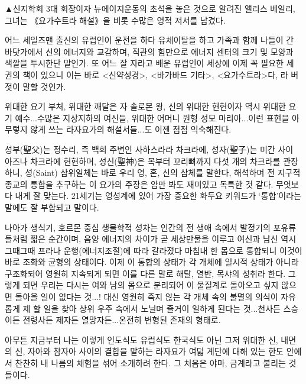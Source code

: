 \documentclass[12pt, a4paper, oneside]{book}
\begin{document}
▲신지학회 3대 회장이자 뉴에이지운동의 초석을 놓은 것으로 알려진 앨리스 베일리, 그녀는 《요가수트라 해설》을 비롯 수많은 영적 저서를 남겼다.






어느 세일즈맨 출신의 유럽인이 운전을 하다 유체이탈을 하고 가족과 함께 나들이 간 바닷가에서 신의 에너지와 교감하며, 직관의 힘만으로 에너지 센터의 크기 및 모양과 색깔을 투시한단 말인가. 또 어느 잘 자라고 배운 유럽인이 세상에 이제 꼭 필요한 세 권의 책이 있으니 이는 바로 <신약성경>, <바가바드 기타>, <요가수트라>다, 라 버젓이 말할 것인가.

위대한 요기 부처, 위대한 깨달은 자 솔로몬 왕, 신의 위대한 현현이자 역시 위대한 요기 예수...수많은 지상지하의 여신들, 위대한 어머니 원형 성모 마리아...이런 표현을 아무렇지 않게 쓰는 라자요가의 해설서들...도 이젠 점점 익숙해진다.




성부(聖父)는 정수리, 즉 백회 주변인 사하스라라 차크라에, 성자(聖子)는 미간 사이 아즈나 차크라에 현현하며, 성신(聖神)은 목부터 꼬리뼈까지 다섯 개의 차크라를 관장하니, 성(Saint) 삼위일체는 바로 우리 영, 혼, 신의 삼체를 말한다, 해석하며 전 지구적 종교의 통합을 추구하는 이 요가의 주장은 암만 봐도 재미있고 독특한 것 같다. 무엇보다 내게 잘 맞는다. 21세기는 영성계에 있어 가장 중요한 화두요 키워드가 ‘통합’이라는 말에도 잘 부합되고 말이다.




나아가 생식기, 호르몬 중심 생물학적 성차는 인간의 전 생애 속에서 발정기의 포유류들처럼 짧은 순간이며, 음양 에너지의 차이가 곧 세상만물을 이루고 여신과 남신 역시 그때그때 프라나 운행(에너지조절)에 따라 갈라졌다 마침내 한 몸으로 통합되니 이것이 바로 조화와 균형의 상태이다. 이제 이 통합의 상태가 각 개체에 일시적 상태가 아니라 구조화되어 영원히 지속되게 되면 이를 다른 말로 해탈, 열반, 목샤의 성취라 한다. 그렇게 되면 우리는 다시는 여와 남의 몸으로 분리되어 이 물질계로 돌아오고 싶지 않으면 돌아올 일이 없다는 것...! 대신 영원히 죽지 않는 각 개체 속의 불멸의 의식이 자유롭게 제 할 일을 찾아 상위 우주 속에서 노닐며 즐거이 일하게 된다는 것...천사든 스승이든 전령사든 제자든 열망자든...온전히 변형된 존재의 형태로.

 

아무튼 지금부터 나는 이렇게 인도식도 유럽식도 한국식도 아닌 그저 위대한 신, 내면의 신, 자아와 참자아 사이의 결합을 말하는 라자요가 여덟 계단에 대해 있는 한도 안에서 찬찬히 내 나름의 체험을 섞어 소개하려 한다. 그 처음은 야마, 금계라고 불리는 것들이다.
\end{document}
